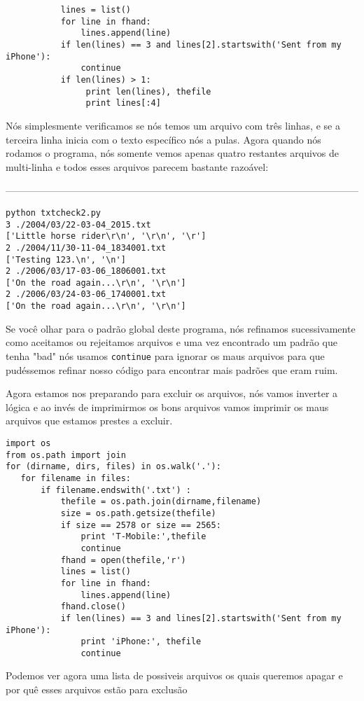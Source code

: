 \begin{verbatim}
           lines = list()
           for line in fhand:
               lines.append(line)
           if len(lines) == 3 and lines[2].startswith('Sent from my iPhone'):
               continue
           if len(lines) > 1:
                print len(lines), thefile
                print lines[:4]
\end{verbatim}

%

Nós simplesmente verificamos se nós temos um arquivo com três linhas, e se a terceira linha inicia com o texto específico 
nós a pulas. Agora quando nós rodamos o programa, nós somente vemos apenas quatro restantes
arquivos de multi-linha e todos esses arquivos parecem bastante razoável:

------------------------------------------------------------------------------------------------------------

\begin{verbatim}
python txtcheck2.py 
3 ./2004/03/22-03-04_2015.txt
['Little horse rider\r\n', '\r\n', '\r']
2 ./2004/11/30-11-04_1834001.txt
['Testing 123.\n', '\n']
2 ./2006/03/17-03-06_1806001.txt
['On the road again...\r\n', '\r\n']
2 ./2006/03/24-03-06_1740001.txt
['On the road again...\r\n', '\r\n']
\end{verbatim}

%

Se você olhar para o padrão global deste programa, nós refinamos sucessivamente como aceitamos ou rejeitamos arquivos e uma vez encontrado um padrão que tenha "bad" nós usamos {\tt continue} para ignorar os maus arquivos para que pudéssemos refinar nosso código para encontrar mais padrões que eram ruim.

Agora estamos nos preparando para excluir os arquivos, nós vamos inverter a lógica e ao invés de imprimirmos os bons arquivos
vamos imprimir os maus arquivos que estamos prestes a excluir.

\begin{verbatim}
import os
from os.path import join
for (dirname, dirs, files) in os.walk('.'):
   for filename in files:
       if filename.endswith('.txt') :
           thefile = os.path.join(dirname,filename)
           size = os.path.getsize(thefile)
           if size == 2578 or size == 2565:
               print 'T-Mobile:',thefile
               continue
           fhand = open(thefile,'r')
           lines = list()
           for line in fhand:
               lines.append(line)
           fhand.close()
           if len(lines) == 3 and lines[2].startswith('Sent from my iPhone'):
               print 'iPhone:', thefile
               continue
\end{verbatim}
%
Podemos ver agora uma lista de possiveis arquivos os quais queremos apagar e por quê esses arquivos estão
para exclusão

